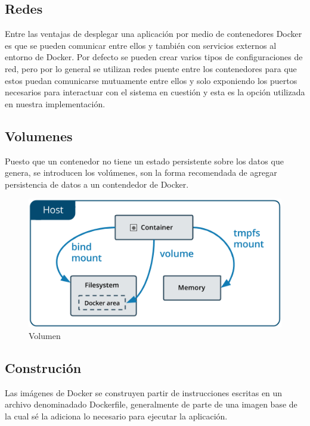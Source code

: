 \subsection{Redes}

Entre las ventajas de desplegar una aplicación por medio de contenedores Docker es que se pueden
comunicar entre ellos y también con servicios externos al entorno de Docker. Por defecto se pueden
crear varios tipos de configuraciones de red, pero por lo general se utilizan redes puente entre
los contenedores para que estos puedan comunicarse mutuamente entre ellos y solo exponiendo los
puertos necesarios para interactuar con el sistema en cuestión y esta es la opción utilizada en
nuestra implementación. \cite{Docker}

\subsection{Volumenes}
Puesto que un contenedor no tiene un estado persistente sobre los datos que genera, se introducen
los volúmenes, son la forma recomendada de agregar persistencia de datos a un contendedor de
Docker.
\cite{Docker}

\begin{figure}[ht]
	\centering
	\includegraphics[width=\textwidth]{imagenes/cap4/docker-volume.png}
	\caption{Volumen}
	\label{fig:volume_diagram}
\end{figure}

\subsection{Construción}
Las imágenes de Docker se construyen partir de instrucciones escritas en un archivo denominadado
Dockerfile,
generalmente de parte de una imagen base de la cual sé la adiciona lo necesario para ejecutar la
aplicación.
\cite{Docker}

